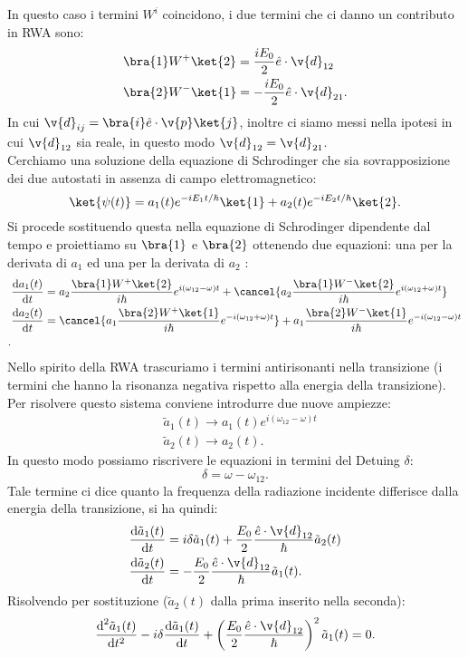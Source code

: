 In questo caso i termini $W^i$ coincidono, i due termini che ci danno un contributo in RWA sono:
\[\begin{aligned}
    &\bra{1}W^+\ket{2} = \frac{iE_0}{2}\hat{e}\cdot \v{d}_{12}\\
    &\bra{2}W^-\ket{1} = -\frac{iE_0}{2}\hat{e}\cdot \v{d}_{21}
.\end{aligned}\]
In cui $\v{d}_{ij}=\bra{i}\hat{e}\cdot \v{p}\ket{j}$, inoltre ci siamo messi nella ipotesi in cui $\v{d}_{12}$ sia reale, in questo modo $\v{d}_{12}=\v{d}_{21}$.\\
Cerchiamo una soluzione della equazione di Schrodinger che sia sovrapposizione dei due autostati in assenza di campo elettromagnetico:
\[
    \ket{\psi(t) } = a_1(t) e^{-iE_1t /\hbar } \ket{1}+ a_2(t) e^{-iE_2t /\hbar } \ket{2}
.\] 
Si procede sostituendo questa nella equazione di Schrodinger dipendente dal tempo e proiettiamo su $\bra{1}$ e $\bra{2}$ ottenendo due equazioni: una per la derivata di $a_1$ ed una per la derivata di $a_2$ :
\[\begin{aligned}
    &\frac{\text{d} a_1(t) }{\text{d} t} =
    a_2 \frac{\bra{1}W^+\ket{2}}{i\hbar }e^{i(\omega_{12}-\omega) t}
    +
    \cancel{a_2\frac{\bra{1}W^-\ket{2}}{i\hbar }e^{i(\omega_{12}+\omega) t}}\\
    &\frac{\text{d} a_2(t) }{\text{d} t} =
    \cancel{a_1 \frac{\bra{2}W^+\ket{1}}{i\hbar }e^{-i(\omega_{12}+\omega) t}}
    +
    a_1\frac{\bra{2}W^-\ket{1}}{i\hbar }e^{-i(\omega_{12}-\omega) t}\\
.\end{aligned}\]
Nello spirito della RWA trascuriamo i termini antirisonanti  nella transizione (i termini che hanno la risonanza negativa rispetto alla energia della transizione).\\
Per risolvere questo sistema conviene introdurre due nuove ampiezze:
\[\begin{aligned}
    &\tilde{a}_1(t) \to a_1(t) e^{i(\omega_{12}-\omega) t}\\
    &\tilde{a}_2(t) \to a_2(t)
.\end{aligned}\]
In questo modo possiamo riscrivere le equazioni in termini del Detuing $\delta$:
\[
\delta  = \omega-\omega_{12}
.\] 
Tale termine ci dice quanto la frequenza della radiazione incidente differisce dalla energia della transizione, si ha quindi:
\[\begin{aligned}
    &\frac{\text{d} \tilde{a}_1(t) }{\text{d} t} = i \delta\tilde{a}_1(t) 
    + \frac{E_0}{2}\frac{\hat{e}\cdot \v{d}_{12}}{\hbar }\tilde{a}_2(t) \\
    &\frac{\text{d} \tilde{a}_2(t)}{\text{d} t} = -\frac{E_0}{2}\frac{\hat{e}\cdot \v{d}_{12}}{\hbar }\tilde{a}_1(t) 
.\end{aligned}\]
Risolvendo per sostituzione ($\tilde{a}_2(t)$ dalla prima inserito nella seconda):
\[
    \frac{\text{d} ^2\tilde{a}_1(t) }{\text{d} t^2} 
    - i\delta\frac{\text{d} \tilde{a}_1(t) }{\text{d} t}
    + \left(\frac{E_0}{2}\frac{\hat{e}\cdot \v{d}_{12}}{\hbar }\right)^2
    \tilde{a}_1(t) = 0
.\] 
